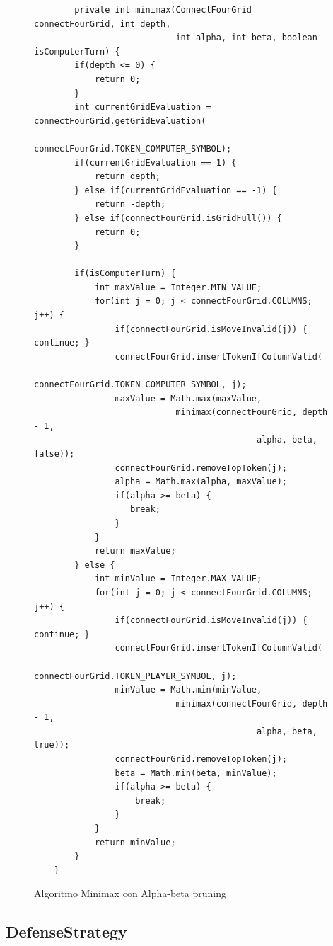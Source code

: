 \begin{figure}
    \centering
    \begin{verbatim}
        private int minimax(ConnectFourGrid connectFourGrid, int depth,
                            int alpha, int beta, boolean isComputerTurn) {
        if(depth <= 0) {
            return 0;
        }
        int currentGridEvaluation = connectFourGrid.getGridEvaluation(
                                    connectFourGrid.TOKEN_COMPUTER_SYMBOL);
        if(currentGridEvaluation == 1) {
            return depth;
        } else if(currentGridEvaluation == -1) {
            return -depth;
        } else if(connectFourGrid.isGridFull()) {
            return 0;
        }

        if(isComputerTurn) {
            int maxValue = Integer.MIN_VALUE;
            for(int j = 0; j < connectFourGrid.COLUMNS; j++) {
                if(connectFourGrid.isMoveInvalid(j)) { continue; }
                connectFourGrid.insertTokenIfColumnValid(
                                connectFourGrid.TOKEN_COMPUTER_SYMBOL, j);
                maxValue = Math.max(maxValue,
                            minimax(connectFourGrid, depth - 1,
                                            alpha, beta, false));
                connectFourGrid.removeTopToken(j);
                alpha = Math.max(alpha, maxValue);
                if(alpha >= beta) {
                   break;
                }
            }
            return maxValue;
        } else {
            int minValue = Integer.MAX_VALUE;
            for(int j = 0; j < connectFourGrid.COLUMNS; j++) {
                if(connectFourGrid.isMoveInvalid(j)) { continue; }
                connectFourGrid.insertTokenIfColumnValid(
                                connectFourGrid.TOKEN_PLAYER_SYMBOL, j);
                minValue = Math.min(minValue,
                            minimax(connectFourGrid, depth - 1,
                                            alpha, beta, true));
                connectFourGrid.removeTopToken(j);
                beta = Math.min(beta, minValue);
                if(alpha >= beta) {
                    break;
                }
            }
            return minValue;
        }
    }
    \end{verbatim}
    \caption{Algoritmo Minimax con Alpha-beta pruning}
    \label{fig:minimax}
\end{figure}

\newpage
\subsection{DefenseStrategy}\label{subsec:defensestrategy}

